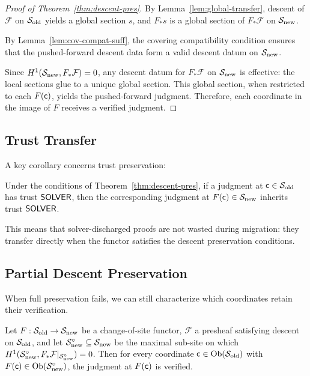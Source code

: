 \documentclass[11pt]{article}
\newcommand{\SiteOld}{\Site_{\mathrm{old}}}
\newcommand{\SiteNew}{\Site_{\mathrm{new}}}
\newcommand{\FunctorF}{F}
\newcommand{\Pushforward}{F_*}
\begin{document}
\begin{proof}[Proof of Theorem~\ref{thm:descent-pres}]
By Lemma~\ref{lem:global-transfer}, descent of $\mathcal{F}$ on $\SiteOld$
yields a global section $s$, and $\Pushforward s$ is a global section of
$\Pushforward\mathcal{F}$ on $\SiteNew$.

By Lemma~\ref{lem:cov-compat-suff}, the covering compatibility condition
ensures that the pushed-forward descent data form a valid descent datum
on $\SiteNew$.

Since $\Hcoh{1}(\SiteNew, \Pushforward\mathcal{F}) = 0$, any descent
datum for $\Pushforward\mathcal{F}$ on $\SiteNew$ is effective: the local
sections glue to a unique global section.  This global section, when
restricted to each $\FunctorF(\coord)$, yields the pushed-forward judgment.
Therefore, each coordinate in the image of $\FunctorF$ receives a verified
judgment.
\end{proof}

\subsection{Trust Transfer}
A key corollary concerns trust preservation:

\begin{corollary}\label{cor:trust-transfer}
Under the conditions of Theorem~\ref{thm:descent-pres}, if a judgment at
$\coord \in \SiteOld$ has trust $\mathsf{SOLVER}$, then the corresponding
judgment at $\FunctorF(\coord) \in \SiteNew$ inherits trust
$\mathsf{SOLVER}$.
\end{corollary}

This means that solver-discharged proofs are not wasted during migration:
they transfer directly when the functor satisfies the descent preservation
conditions.

\subsection{Partial Descent Preservation}

When full preservation fails, we can still characterize which coordinates
retain their verification.

\begin{theorem}\label{thm:partial-preservation}
Let $\FunctorF : \SiteOld \to \SiteNew$ be a change-of-site functor,
$\mathcal{F}$ a presheaf satisfying descent on $\SiteOld$, and let
$\SiteNew^{\circ} \subseteq \SiteNew$ be the maximal sub-site on which
$\Hcoh{1}(\SiteNew^{\circ}, \Pushforward\mathcal{F}|_{\SiteNew^{\circ}}) =
0$.  Then for every coordinate $\coord \in \Ob(\SiteOld)$ with
$\FunctorF(\coord) \in \Ob(\SiteNew^{\circ})$, the judgment at
$\FunctorF(\coord)$ is verified.
\end{theorem}
\end{document}
